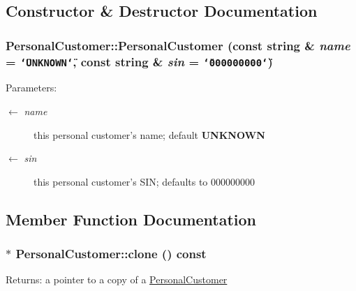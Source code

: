 \subsection{Constructor \& Destructor Documentation}
\hypertarget{classPersonalCustomer_a85bdbac31d8424ff81a44d803fbec53}{
\subsubsection[PersonalCustomer]{\setlength{\rightskip}{0pt plus 5cm}PersonalCustomer::PersonalCustomer (const string \& {\em name} = {\tt \char`\"{}UNKNOWN\char`\"{}}, \/  const string \& {\em sin} = {\tt \char`\"{}000000000\char`\"{}})}}
\label{classPersonalCustomer_a85bdbac31d8424ff81a44d803fbec53}


\begin{Desc}
\item[Parameters:]
\begin{description}
\item[\mbox{$\leftarrow$} {\em name}]this personal customer's name; default {\bf UNKNOWN} \item[\mbox{$\leftarrow$} {\em sin}]this personal customer's SIN; defaults to 000000000 \end{description}
\end{Desc}


\subsection{Member Function Documentation}
\hypertarget{classPersonalCustomer_a1e9e9e14356c0ff7a3d97c999e44388}{
\subsubsection[clone]{ $\ast$ PersonalCustomer::clone () const}}
\label{classPersonalCustomer_a1e9e9e14356c0ff7a3d97c999e44388}


\begin{Desc}
\item[Returns:]a pointer to a copy of a \hyperlink{classPersonalCustomer}{PersonalCustomer} \end{Desc}


